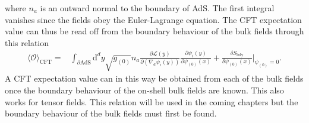 \documentclass[12pt]{report}
\renewcommand{\d}{\ensuremath{\mathrm{d}}}
\renewcommand{\L}{\ensuremath{\mathcal{L}}}
\begin{document}
where $n_a$ is an outward normal to the boundary of AdS.
The first integral vanishes since the fields obey the Euler-Lagrange equation. The CFT expectation value can thus be read off from the boundary behaviour of the bulk fields through this relation
\begin{equation}
\begin{split}
\langle\mathcal{O}\rangle_{\mathrm{CFT}}=&\int_{\partial\mathrm{AdS}} \d^{d}y\sqrt{g_{(0)}}n_a\frac{\partial\L(y)}{\partial (\nabla_a\psi_i(y))}\frac{\partial \psi_i(y)}{\partial \psi_{(0)}(x)}+\frac{\delta S_{\mathrm{bdy}}}{\delta \psi_{(0)}(x)}|_{\psi_{(0)}=0}.\label{expFromBdy}
\end{split}
\end{equation}
A CFT expectation value can in this way be obtained from each of the bulk fields once the boundary behaviour of the on-shell bulk fields are known. This also works for tensor fields. This relation will be used in the coming chapters but the boundary behaviour of the bulk fields must first be found.
% 
\end{document}
